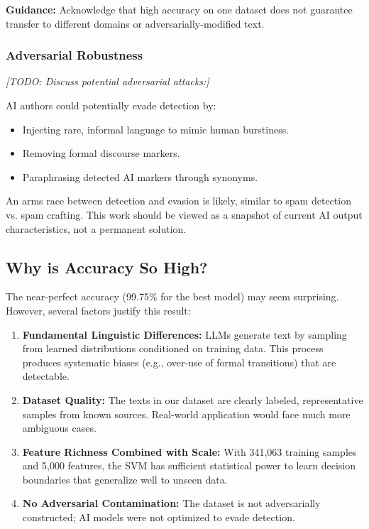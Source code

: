 \documentclass[12pt, a4paper]{article}
\begin{document}
\textbf{Guidance:} Acknowledge that high accuracy on one dataset does not guarantee transfer to different domains or adversarially-modified text.

\subsubsection{Adversarial Robustness}

\textit{[TODO: Discuss potential adversarial attacks:]}

AI authors could potentially evade detection by:
\begin{itemize}
    \item Injecting rare, informal language to mimic human burstiness.
    \item Removing formal discourse markers.
    \item Paraphrasing detected AI markers through synonyms.
\end{itemize}

An arms race between detection and evasion is likely, similar to spam detection vs. spam crafting. This work should be viewed as a snapshot of current AI output characteristics, not a permanent solution.

\subsection{Why is Accuracy So High?}

The near-perfect accuracy (99.75\% for the best model) may seem surprising. However, several factors justify this result:

\begin{enumerate}
    \item \textbf{Fundamental Linguistic Differences:} LLMs generate text by sampling from learned distributions conditioned on training data. This process produces systematic biases (e.g., over-use of formal transitions) that are detectable.
    
    \item \textbf{Dataset Quality:} The texts in our dataset are clearly labeled, representative samples from known sources. Real-world application would face much more ambiguous cases.
    
    \item \textbf{Feature Richness Combined with Scale:} With 341,063 training samples and 5,000 features, the SVM has sufficient statistical power to learn decision boundaries that generalize well to unseen data.
    
    \item \textbf{No Adversarial Contamination:} The dataset is not adversarially constructed; AI models were not optimized to evade detection.
\end{enumerate}
\end{document}

